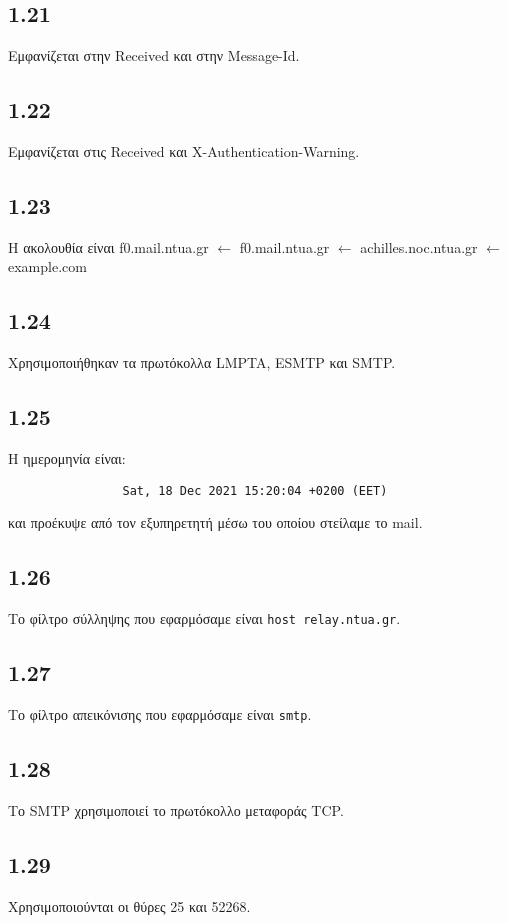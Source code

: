 		\subsection*{1.21} 
			Εμφανίζεται στην Received και στην Message-Id.

		\subsection*{1.22} 
			Εμφανίζεται στις Received και X-Authentication-Warning.

		\subsection*{1.23} 
			Η ακολουθία είναι f0.mail.ntua.gr $\leftarrow$ f0.mail.ntua.gr $\leftarrow$ achilles.noc.ntua.gr $\leftarrow$ example.com

		\subsection*{1.24} 
			Χρησιμοποιήθηκαν τα πρωτόκολλα LMPTA, ESMTP και SMTP.

		\subsection*{1.25} 
			Η ημερομηνία είναι:
			
			\begin{verbatim}
				Sat, 18 Dec 2021 15:20:04 +0200 (EET)
			\end{verbatim} 
			
			και προέκυψε από τον εξυπηρετητή μέσω του οποίου στείλαμε το mail.

		\subsection*{1.26} 
			Το φίλτρο σύλληψης που εφαρμόσαμε είναι \verb|host relay.ntua.gr|.

		\subsection*{1.27} 
			Το φίλτρο απεικόνισης που εφαρμόσαμε είναι \verb|smtp|.

		\subsection*{1.28} 
			Το SMTP χρησιμοποιεί το πρωτόκολλο μεταφοράς TCP.

		\subsection*{1.29} 
			Χρησιμοποιούνται οι θύρες 25 και 52268.

